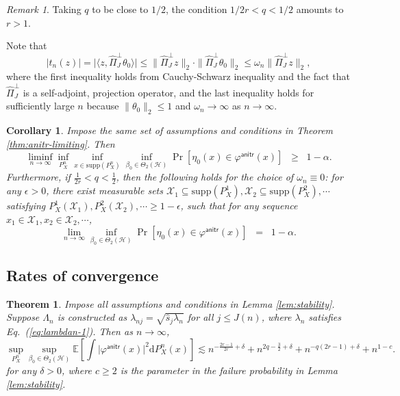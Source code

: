\documentclass[11pt,a4paper]{article}
\renewcommand{\hat}{\widehat}
\theoremstyle{definition}
\theoremstyle{plain}
\newtheorem{theorem}{Theorem}[section]
\newtheorem{corollary}{Corollary}[section]
\theoremstyle{remark}
\newtheorem{remark}{Remark}[section]
\newcommand{\supp}{\mathrm{supp}}
\newcommand{\mX}{\mathcal X}
\newcommand{\ud}{\mathrm d}
\newcommand{\mH}{\mathcal H}
\newcommand{\anitr}{\mathsf{anitr}}
\begin{document}
\begin{remark}
Taking $q$ to be close to $1/2$, the condition $1/2r<q<1/2$ amounts to $r>1$.
\end{remark}

Note that 
\begin{equation}
\big|t_n(z)\big| = \big|\langle z, \hat\Pi_J^\perp\theta_0\rangle\big| \leq \|\hat\Pi_J^\perp z\|_2\cdot \|\hat\Pi_J^\perp\theta_0\|_2 \leq \omega_n\|\hat\Pi_J^\perp z\|_2,
\label{eq:anitr-limiting-impl}
\end{equation}
where the first inequality holds from Cauchy-Schwarz inequality and the fact that $\hat\Pi_J^\perp$ is a self-adjoint, projection operator, and the 
last inequality holds for sufficiently large $n$ because $\|\theta_0\|_2\leq 1$ and $\omega_n\to\infty$ as $n\to\infty$.

\begin{corollary}
Impose the same set of assumptions and conditions in Theorem \ref{thm:anitr-limiting}. Then
$$
\liminf_{n\to\infty}\inf_{P_X^n}\inf_{x\in\supp(P_X^n)}\inf_{\beta_0\in\Theta_2(\mH)}\Pr[\eta_0(x)\in\varphi^\anitr(x)] \;\;\geq\;\; 1-\alpha.
$$
Furthermore, if $\frac{1}{2r}<q<\frac{1}{2}$, then the following holds for the choice of $\omega_n\equiv 0$:
for any $\epsilon>0$, there exist measurable sets $\mX_1\subseteq\supp(P_X^1),\mX_2\subseteq\supp(P_X^2),\cdots$ satisfying $P_X^1(\mX_1),P_X^2(\mX_2),\cdots\geq 1-\epsilon$,
such that for any sequence $x_1\in\mX_1,x_2\in\mX_2,\cdots$, 
$$
\lim_{n\to\infty}\inf_{\beta_0\in\Theta_2(\mH)} \Pr[\eta_0(x)\in\varphi^\anitr(x)] \;\; = \;\; 1-\alpha.
$$
\label{cor:anitr}
\end{corollary}

\subsection{Rates of convergence}

\begin{theorem}
Impose all assumptions and conditions in Lemma \ref{lem:stability}. Suppose $\Lambda_n$ is constructed as $\lambda_{nj}=\sqrt{\hat s_j\lambda_n}$ for all $j\leq J(n)$,
where $\lambda_n$ satisfies Eq.~(\ref{eq:lambdan-1}). Then as $n\to\infty$, 
$$
\sup_{P_X^n}\sup_{\beta_0\in\Theta_2(\mH)}\mathbb E\left[\int \big|\varphi^\anitr(x)\big|^2\ud P_X^n(x) \right] \lesssim n^{-\frac{2r-1}{2r}+\delta} + n^{2q-\frac{3}{2}+\delta} + n^{-q(2r-1)+\delta} + n^{1-c}.
$$
for any $\delta>0$, where $c\geq 2$ is the parameter in the failure probability in Lemma \ref{lem:stability}.
\label{thm:anitr-rates}
\end{theorem}
\end{document}
